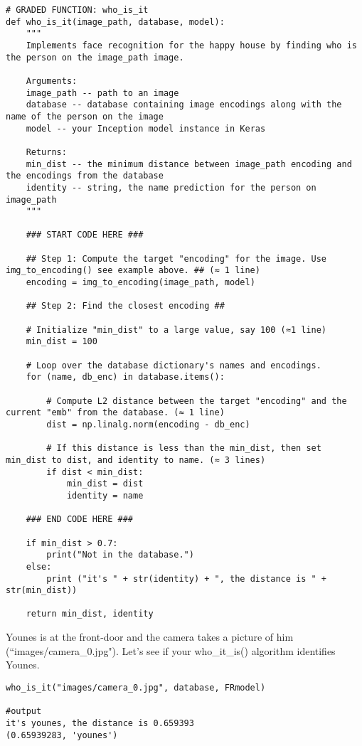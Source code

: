 \begin{verbatim}
# GRADED FUNCTION: who_is_it
def who_is_it(image_path, database, model):
    """
    Implements face recognition for the happy house by finding who is the person on the image_path image.
    
    Arguments:
    image_path -- path to an image
    database -- database containing image encodings along with the name of the person on the image
    model -- your Inception model instance in Keras
    
    Returns:
    min_dist -- the minimum distance between image_path encoding and the encodings from the database
    identity -- string, the name prediction for the person on image_path
    """
    
    ### START CODE HERE ### 
    
    ## Step 1: Compute the target "encoding" for the image. Use img_to_encoding() see example above. ## (≈ 1 line)
    encoding = img_to_encoding(image_path, model)
    
    ## Step 2: Find the closest encoding ##
    
    # Initialize "min_dist" to a large value, say 100 (≈1 line)
    min_dist = 100
    
    # Loop over the database dictionary's names and encodings.
    for (name, db_enc) in database.items():
        
        # Compute L2 distance between the target "encoding" and the current "emb" from the database. (≈ 1 line)
        dist = np.linalg.norm(encoding - db_enc)

        # If this distance is less than the min_dist, then set min_dist to dist, and identity to name. (≈ 3 lines)
        if dist < min_dist:
            min_dist = dist
            identity = name

    ### END CODE HERE ###
    
    if min_dist > 0.7:
        print("Not in the database.")
    else:
        print ("it's " + str(identity) + ", the distance is " + str(min_dist))
        
    return min_dist, identity
\end{verbatim}        
        
Younes is at the front-door and the camera takes a picture of him (``images/camera\_0.jpg"). Let's see if your who\_it\_is() algorithm identifies Younes.
\begin{verbatim}
who_is_it("images/camera_0.jpg", database, FRmodel)

#output
it's younes, the distance is 0.659393
(0.65939283, 'younes')
\end{verbatim}   
        

